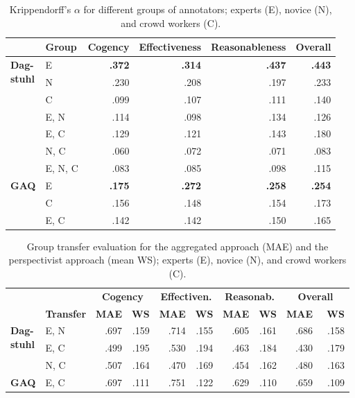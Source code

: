 \begin{table}[t]
\centering
\scriptsize
\renewcommand{\arraystretch}{1}
\setlength{\tabcolsep}{4.2pt}
\begin{tabular}{p{0.5cm}lrrrr}
\toprule
&\bf Group  & \bf Cogency & \bf Effectiveness & \bf Reasonableness & \bf Overall\\
\midrule
\multirow{3}{*}{\parbox{0.6cm}{\textbf{Dag-\\stuhl}}} 
& E & \bf .372 & \bf .314 & \bf .437 & \bf .443 \\
& N & .230 & .208 & .197 & .233 \\
& C & .099 & .107 & .111 & .140 \\
& E, N & .114 & .098 & .134 & .126 \\
& E, C & .129 & .121 & .143 & .180 \\
& N, C& .060 & .072 & .071 & .083 \\
& E, N, C & .083 & .085 & .098 & .115 \\
\midrule
\textbf{GAQ} 
& E & \bf .175 & \bf .272 & \bf .258 & \bf .254 \\
& C & .156 & .148 & .154 & .173 \\
& E, C & .142 & .142 & .150 & .165 \\
\bottomrule
\end{tabular}
\caption{Krippendorff's $\alpha$ for different groups of annotators; experts (E), novice (N), and crowd workers (C).}
\label{tab:iaa}
\end{table}

\begin{table}[t]
\centering
\scriptsize
\renewcommand{\arraystretch}{1}
\setlength{\tabcolsep}{3.1pt}
\begin{tabular}{p{0.5cm}lrrrrrrrr}
\toprule
&& \multicolumn{2}{c}{\bf Cogency} & \multicolumn{2}{c}{\bf  Effectiven.} & \multicolumn{2}{c}{\bf  Reasonab.} & \multicolumn{2}{c}{\bf  Overall} \\ 
\cmidrule(lr){3-4}\cmidrule(lr){5-6}\cmidrule(lr){7-8}\cmidrule(lr){9-10}
&\bf  Transfer& \bf MAE &\bf WS& \bf MAE& \bf WS &\bf MAE& \bf WS &\bf MAE & \bf WS \\
\midrule
\multirow{3}{*}{\parbox{0.6cm}{\textbf{Dag-\\stuhl}}} &E, N & .697&  .159 & .714 & .155& .605& .161 & .686 & .158\\
&E, C & .499&.195 & .530&.194 & .463&.184 & .430&.179 \\
&N, C & .507&.164 &.470&.169 & .454&.162 & .480&.163 \\
\midrule
\textbf{GAQ} & E, C &.697& .111&.751& .122& .629& .110 &  .659&\ .109\\
\bottomrule
\end{tabular}
\caption{Group transfer evaluation for the aggregated approach (MAE) and the perspectivist approach (mean WS); experts (E), novice (N), and crowd workers (C).}
\label{tab:cross-group-dist}
\end{table}


